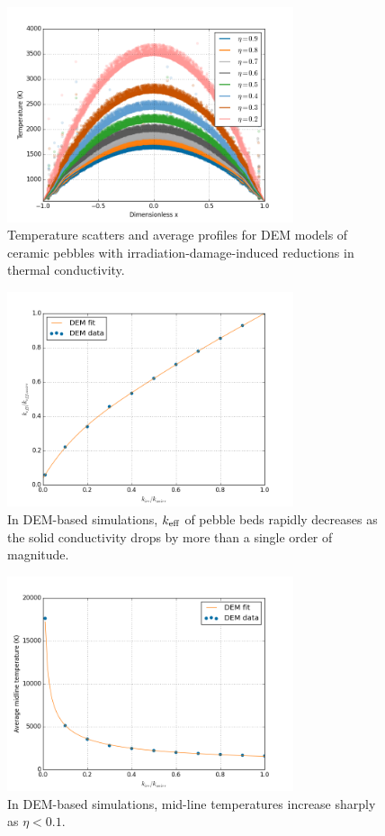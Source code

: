 \begin{figure}[ht]
    \centering
    \includegraphics[width = 0.75\textwidth]{figures/irradiated/irradiated-temperatures.png}
    \caption{Temperature scatters and average profiles for DEM models of ceramic pebbles with irradiation-damage-induced reductions in thermal conductivity.}\label{fig:irrad-temps}
\end{figure}

\begin{figure}[ht]
    \centering
    \includegraphics[width = 0.75\textwidth]{figures/irradiated/keff-plots.png}
    \caption{In DEM-based simulations, $k_\text{eff}$ of pebble beds rapidly decreases as the solid conductivity drops by more than a single order of magnitude.}\label{fig:irrad-keff}
\end{figure}

\begin{figure}[ht]
    \centering
    \includegraphics[width = 0.75\textwidth]{figures/irradiated/Tmid-plots.png}
    \caption{In DEM-based simulations, mid-line temperatures increase sharply as $\eta < 0.1$.}\label{fig:irrad-mids}
\end{figure}

